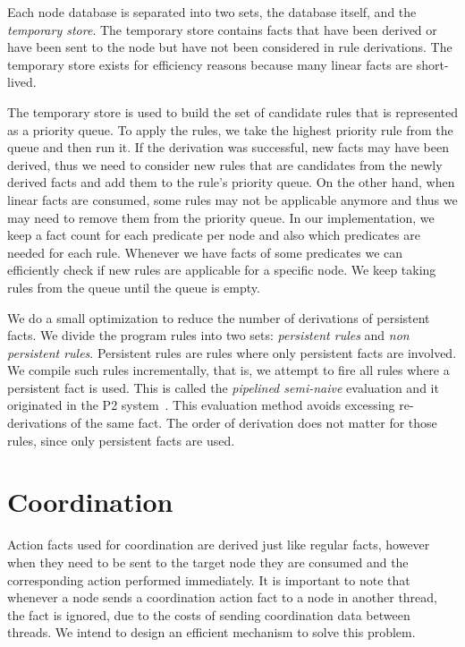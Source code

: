 Each node database is separated into two sets,
the database itself, and the \emph{temporary store}. The temporary store contains facts that have been
derived or have been sent to the node but have not been considered in rule derivations.
The temporary store exists for efficiency reasons because many linear facts are short-lived.

The temporary store is used to build the set of candidate rules that is represented as a priority queue.
To apply the rules, we take the highest priority rule from the queue and then run it.
If the derivation was successful, new facts may have been derived, thus we need to consider new
rules that are candidates from the newly derived facts and add them to the rule's priority queue.
On the other hand, when linear facts are consumed, some rules may not be applicable anymore and thus
we may need to remove them from the priority queue. In our implementation,
we keep a fact count for each predicate per node and also which predicates are needed for each rule. Whenever we have facts of some
predicates we can efficiently check if new rules are applicable for a specific node. We keep taking rules from the
queue until the queue is empty.

We do a small optimization to reduce the number of derivations of persistent facts. We
divide the program rules into two sets: \emph{persistent rules} and \emph{non persistent rules}.
Persistent rules are rules where only persistent facts are involved. We compile such rules
incrementally, that is, we attempt to fire all rules where a persistent fact is used. This is called
the \emph{pipelined semi-naive} evaluation and it originated in the P2 system~\cite{Loo-condie-garofalakis-p2}.
This evaluation method avoids excessing re-derivations of the same fact. The order of derivation does not matter for those rules, since
only persistent facts are used.

\section{Coordination}

Action facts used for coordination are derived just like regular facts, however when they need to be sent to the target node
they are consumed and the corresponding action performed immediately.
It is important to note that whenever a node sends a coordination action fact to a node in another thread,
the fact is ignored, due to the costs of sending
coordination data between threads. We intend to design an efficient mechanism to solve this problem.

